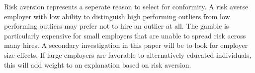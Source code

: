 \documentclass[review]{elsarticle}
\begin{document}



Risk aversion represents a seperate reason to select for conformity.
A risk averse employer with low ability to distinguish high performing outliers from low performing outliers may prefer not to hire an outlier at all.
The gamble is particularly expensive for small employers that are unable to spread risk across many hires.
A secondary investigation in this paper will be to look for employer size effects.
If large employers are favorable to alternatively educated individuals, this will add weight to an explanation based on risk aversion.

\end{document}
